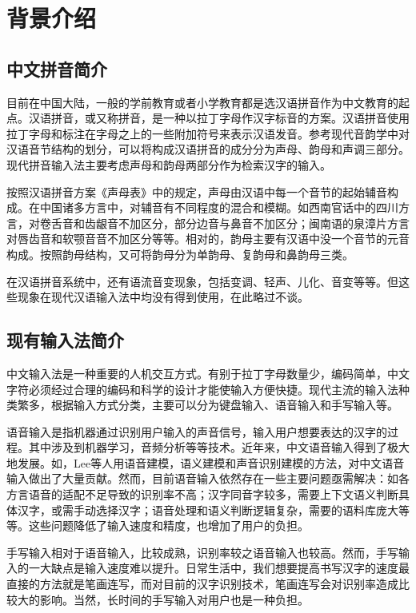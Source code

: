 \chapter{背景介绍}
  \section{中文拼音简介}

  目前在中国大陆，一般的学前教育或者小学教育都是选汉语拼音作为中文教育的起点。汉语拼音，或又称拼音，是一种以拉丁字母作汉字标音的方案。\supercite{wjm}汉语拼音使用拉丁字母和标注在字母之上的一些附加符号来表示汉语发音。参考现代音韵学中对汉语音节结构的划分，可以将构成汉语拼音的成分分为声母、韵母和声调三部分。现代拼音输入法主要考虑声母和韵母两部分作为检索汉字的输入。

  按照汉语拼音方案《声母表》中的规定，声母由汉语中每一个音节的起始辅音构成。在中国诸多方言中，对辅音有不同程度的混合和模糊。如西南官话中的四川方言，对卷舌音和齿龈音不加区分，部分边音与鼻音不加区分；闽南语的泉漳片方言对唇齿音和软颚音音不加区分等等。\supercite{jdp}相对的，韵母主要有汉语中没一个音节的元音构成。按照韵母结构，又可将韵母分为单韵母、复韵母和鼻韵母三类。

  在汉语拼音系统中，还有语流音变现象，包括变调、轻声、儿化、音变等等。但这些现象在现代汉语输入法中均没有得到使用，在此略过不谈。

  \section{现有输入法简介\label{sec:current_input}}

  中文输入法是一种重要的人机交互方式。有别于拉丁字母数量少，编码简单，中文字符必须经过合理的编码和科学的设计才能使输入方便快捷。现代主流的输入法种类繁多，根据输入方式分类，主要可以分为键盘输入、语音输入和手写输入等。

  语音输入是指机器通过识别用户输入的声音信号，输入用户想要表达的汉字的过程。其中涉及到机器学习，音频分析等等技术。近年来，中文语音输入得到了极大地发展。如，Lee等人\supercite{lee5system, lee1997voice, lee1993mandarin}用语音建模，语义建模和声音识别建模的方法，对中文语音输入做出了大量贡献。然而，目前语音输入依然存在一些主要问题亟需解决：如各方言语音的适配不足导致的识别率不高\supercite{chen2000tone}；汉字同音字较多，需要上下文语义判断具体汉字，或需手动选择汉字；语音处理和语义判断逻辑复杂，需要的语料库庞大等等。这些问题降低了输入速度和精度，也增加了用户的负担。

  手写输入相对于语音输入，比较成熟，识别率较之语音输入也较高。然而，手写输入的一大缺点是输入速度难以提升。日常生活中，我们想要提高书写汉字的速度最直接的方法就是笔画连写，而对目前的汉字识别技术，笔画连写会对识别率造成比较大的影响。\supercite{srihari2007offline}当然，长时间的手写输入对用户也是一种负担。

